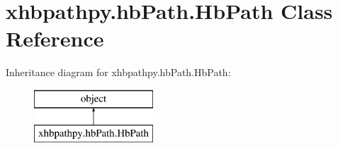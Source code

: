 \hypertarget{classxhbpathpy_1_1hb_path_1_1_hb_path}{\section{xhbpathpy.\-hb\-Path.\-Hb\-Path Class Reference}
\label{classxhbpathpy_1_1hb_path_1_1_hb_path}
}
Inheritance diagram for xhbpathpy.\-hb\-Path.\-Hb\-Path\-:\begin{figure}[H]
\begin{center}
\leavevmode
\includegraphics[height=2.000000cm]{classxhbpathpy_1_1hb_path_1_1_hb_path}
\end{center}
\end{figure}
